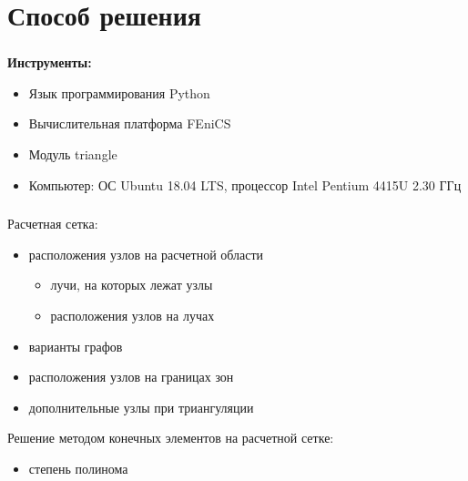 \section{Способ решения}

\begin{frame}
\frametitle{\insertsection}

\textbf{Инструменты:}
\begin{itemize}
    \item Язык программирования Python
    \item Вычислительная платформа FEniCS
    \item Модуль triangle
    \item Компьютер: ОС Ubuntu 18.04 LTS, процессор Intel Pentium 4415U 2.30 ГГц
\end{itemize}
\end{frame}


\begin{frame}
\frametitle{\insertsection}

Расчетная сетка:
\begin{itemize}
\item расположения узлов на расчетной области
\begin{itemize}
  \item лучи, на которых лежат узлы
  \item расположения узлов на лучах
\end{itemize}
\item варианты графов
\item расположения узлов на границах зон
\item дополнительные узлы при триангуляции
\end{itemize}
\bigskip

Решение методом конечных элементов на расчетной сетке:
\begin{itemize}
    \item степень полинома
\end{itemize}
\end{frame}

